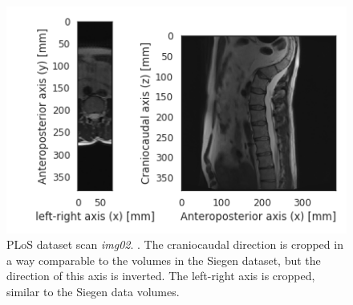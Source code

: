 \begin{figure}
    \centering
    \includegraphics[width=.95\textwidth]{automated_graphs/PLoS_img02.png}
    \caption{
        PLoS dataset scan \textit{img02}. \label{fig:PLoS_img02}. The craniocaudal direction is cropped in a way comparable to the volumes in the Siegen dataset, but the direction of this axis is inverted.
        The left-right axis is cropped, similar to the Siegen data volumes.
    }
\end{figure}